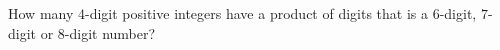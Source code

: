 How many $4$-digit positive integers have a product of digits that is a $6$-digit, $7$-digit or $8$-digit number?
